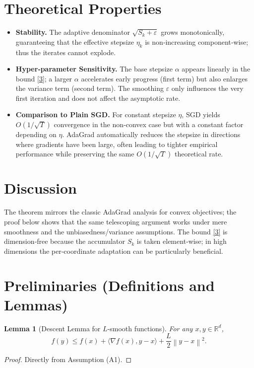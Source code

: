 \documentclass{article}
\newtheorem{lemma}{Lemma}
\newcommand{\R}{\mathbb{R}}
\newcommand{\norm}[1]{\left\|#1\right\|}
\begin{document}
\section*{Theoretical Properties}
\begin{itemize}[leftmargin=*]
\item \textbf{Stability.} The adaptive denominator $\sqrt{S_{k}+\varepsilon}$ grows monotonically, guaranteeing that the effective stepsize $\eta_{k}$ is non‑increasing component‑wise; thus the iterates cannot explode.
\item \textbf{Hyper‑parameter Sensitivity.} The base stepsize $\alpha$ appears linearly in the bound \eqref{3}; a larger $\alpha$ accelerates early progress (first term) but also enlarges the variance term (second term). The smoothing $\varepsilon$ only influences the very first iteration and does not affect the asymptotic rate.
\item \textbf{Comparison to Plain SGD.} For constant stepsize $\eta$, SGD yields $O(1/\sqrt{T})$ convergence in the non‑convex case but with a constant factor depending on $\eta$. AdaGrad automatically reduces the stepsize in directions where gradients have been large, often leading to tighter empirical performance while preserving the same $O(1/\sqrt{T})$ theoretical rate.
\end{itemize}

\section*{Discussion}
The theorem mirrors the classic AdaGrad analysis for convex objectives; the proof below shows that the same telescoping argument works under mere smoothness and the unbiasedness/variance assumptions. The bound \eqref{3} is dimension‑free because the accumulator $S_{k}$ is taken element‑wise; in high dimensions the per‑coordinate adaptation can be particularly beneficial.

\newpage
\section*{Preliminaries (Definitions and Lemmas)}
\begin{lemma}[Descent Lemma for $L$‑smooth functions]
\label{lem:descent}
For any $x,y\in\R^{d}$,
\[
f(y)\le f(x)+\langle\nabla f(x),y-x\rangle+\frac{L}{2}\norm{y-x}^{2}.
\]
\end{lemma}
\begin{proof}
Directly from Assumption (A1). \qedhere
\end{proof}
\end{document}
